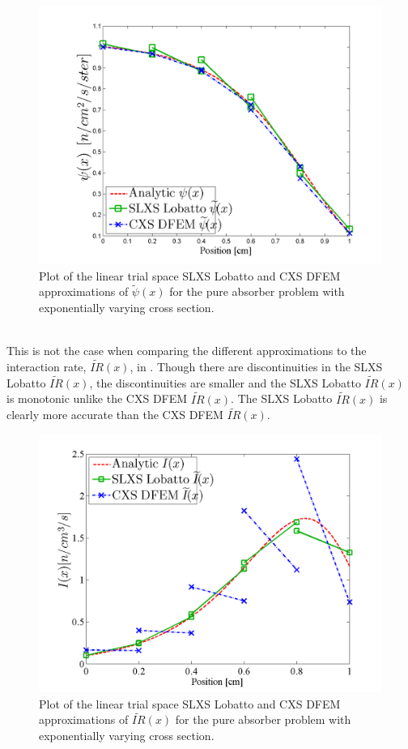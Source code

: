 \begin{figure}[!htp]
\centering
\includegraphics[width=12cm]{chapter3_variable_xs/SLXS_Psi_Profile.png}
\caption{Plot of the linear trial space SLXS Lobatto and CXS DFEM approximations of $\widetilde{\psi}(x)$ for the pure absorber problem with exponentially varying cross section.}
\label{fig:lobatto_blades_psi}
\end{figure}
%
\\
This is not the case when comparing the different approximations to the interaction rate, $\widetilde{IR}(x)$, in .  
Though there are discontinuities in the SLXS Lobatto $\widetilde{IR}(x)$, the discontinuities are smaller and the SLXS Lobatto $\widetilde{IR}(x)$ is monotonic unlike the CXS DFEM $\widetilde{IR}(x)$.   
The SLXS Lobatto $\widetilde{IR}(x)$ is clearly more accurate than the CXS DFEM $\widetilde{IR}(x)$.
%
\begin{figure}[!htp]
\centering
\includegraphics[width=12cm]{chapter3_variable_xs/SLXS_I_Profile.png}
\caption{Plot of the linear trial space SLXS Lobatto and CXS DFEM approximations of $\widetilde{IR}(x)$ for the pure absorber problem with exponentially varying cross section.}
\label{fig:lobatto_blades_ir}
\end{figure}
